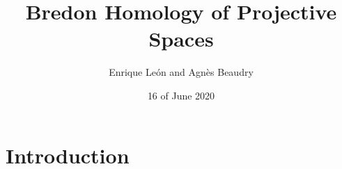\documentclass[12pt]{article}
\begin{document}
\title{Bredon Homology of Projective Spaces}
\author{Enrique Le\'{o}n and Agn\`{e}s Beaudry}
\date{16 of June 2020}
\maketitle
\section{Introduction}
    
    
    
    
    
    
    
    
    
\end{document}
